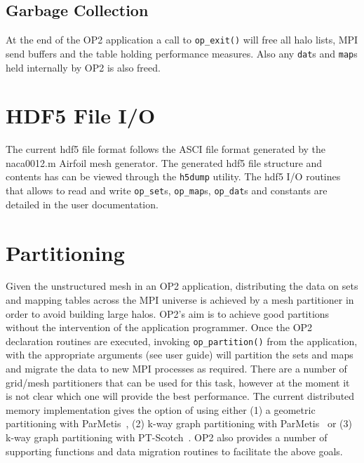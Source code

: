 \documentclass[11pt]{article}
\begin{document}
\subsection{Garbage Collection}\label{subsec/cleanup}
At the end of the OP2 application a call to \texttt{op\_exit()} will free all halo lists, MPI send buffers and the table
holding performance measures. Also any \texttt{dat}s and \texttt{map}s held internally by OP2 is also freed.

\section{HDF5 File I/O}\label{sec/hdf5}
The current hdf5 file format follows the ASCI file format generated by the naca0012.m Airfoil mesh generator. The
generated hdf5 file structure and contents has can be viewed through the \texttt{h5dump} utility.  The hdf5 I/O routines
that allows to read and write \texttt{op\_set}s, \texttt{op\_map}s, \texttt{op\_dat}s and constants are detailed in the
user documentation.






\newpage
\section{Partitioning}\label{sec/partitioning}
Given the unstructured mesh in an OP2 application, distributing the data on sets and mapping tables across the MPI
universe is achieved by a mesh partitioner in order to avoid building large halos. OP2's aim is to achieve good
partitions without the intervention of the application programmer. Once the OP2 declaration routines are executed,
invoking \texttt{op\_partition()} from the application, with the appropriate arguments (see user guide) will partition
the sets and maps and migrate the data to new MPI processes as required. There are a number of grid/mesh partitioners
that can be used for this task, however at the moment it is not clear which one will provide the best performance. The
current distributed memory implementation gives the option of using either (1) a geometric partitioning with
ParMetis~\cite{ParMETIS}, (2) k-way graph partitioning with ParMetis~\cite{ParMETIS} or (3) k-way graph partitioning
with PT-Scotch~\cite{PTScotch}. OP2 also provides a number of supporting functions and data migration routines to
facilitate the above goals.\\
\end{document}
